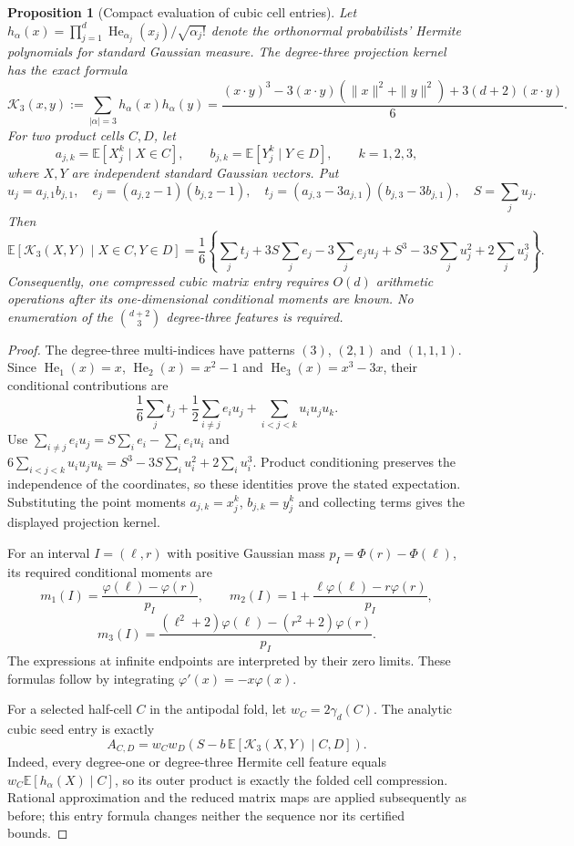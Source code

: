\documentclass[11pt]{article}
\newtheorem{proposition}[theorem]{Proposition}
\begin{document}
\begin{proposition}[Compact evaluation of cubic cell entries]
\label{prop:new-compact-cubic-cell-entry}
Let $h_\alpha(x)=\prod_{j=1}^d
\operatorname{He}_{\alpha_j}(x_j)/\sqrt{\alpha_j!}$ denote the
orthonormal probabilists' Hermite polynomials for standard Gaussian
measure. The degree-three projection kernel has the exact formula
\[
 \mathcal K_3(x,y):=\sum_{|\alpha|=3}h_\alpha(x)h_\alpha(y)
 =\frac{(x\cdot y)^3-3(x\cdot y)(\|x\|^2+\|y\|^2)
                  +3(d+2)(x\cdot y)}6.
\]
For two product cells $C,D$, let
\[
 a_{j,k}=\mathbb E[X_j^k\mid X\in C],\qquad
 b_{j,k}=\mathbb E[Y_j^k\mid Y\in D],\qquad k=1,2,3,
\]
where $X,Y$ are independent standard Gaussian vectors. Put
\[
 u_j=a_{j,1}b_{j,1},\quad
 e_j=(a_{j,2}-1)(b_{j,2}-1),\quad
 t_j=(a_{j,3}-3a_{j,1})(b_{j,3}-3b_{j,1}),\quad S=\sum_j u_j.
\]
Then
\[
 \mathbb E[\mathcal K_3(X,Y)\mid X\in C,Y\in D]
 =\frac16\left\{
 \sum_j t_j+3S\sum_j e_j-3\sum_j e_ju_j
          +S^3-3S\sum_j u_j^2+2\sum_j u_j^3\right\}.
\]
Consequently, one compressed cubic matrix entry requires $O(d)$
arithmetic operations after its one-dimensional conditional moments are
known. No enumeration of the $\binom{d+2}{3}$ degree-three features is
required.
\end{proposition}
\begin{proof}
The degree-three multi-indices have patterns $(3)$, $(2,1)$ and
$(1,1,1)$. Since $\operatorname{He}_1(x)=x$,
$\operatorname{He}_2(x)=x^2-1$ and
$\operatorname{He}_3(x)=x^3-3x$, their conditional contributions are
\[
 \frac16\sum_j t_j
 +\frac12\sum_{i\ne j}e_i u_j
 +\sum_{i<j<k}u_i u_j u_k.
\]
Use $\sum_{i\ne j}e_i u_j=S\sum_i e_i-\sum_i e_i u_i$ and
$6\sum_{i<j<k}u_i u_j u_k
 =S^3-3S\sum_i u_i^2+2\sum_i u_i^3$.
Product conditioning preserves the independence of the coordinates,
so these identities prove the stated expectation. Substituting the
point moments $a_{j,k}=x_j^k$, $b_{j,k}=y_j^k$ and collecting terms
gives the displayed projection kernel.

For an interval $I=(\ell,r)$ with positive Gaussian mass
$p_I=\Phi(r)-\Phi(\ell)$, its required conditional moments are
\[
 m_1(I)=\frac{\varphi(\ell)-\varphi(r)}{p_I},\qquad
 m_2(I)=1+\frac{\ell\varphi(\ell)-r\varphi(r)}{p_I},
\]
\[
 m_3(I)=
 \frac{(\ell^2+2)\varphi(\ell)-(r^2+2)\varphi(r)}{p_I}.
\]
The expressions at infinite endpoints are interpreted by their zero
limits. These formulas follow by integrating
$\varphi'(x)=-x\varphi(x)$.

For a selected half-cell $C$ in the antipodal fold, let
$w_C=2\gamma_d(C)$. The analytic cubic seed entry is exactly
\[
 A_{C,D}=w_Cw_D\left(S-
 b\,\mathbb E[\mathcal K_3(X,Y)\mid C,D]\right).
\]
Indeed, every degree-one or degree-three Hermite cell feature equals
$w_C\mathbb E[h_\alpha(X)\mid C]$, so its outer product is exactly
the folded cell compression. Rational approximation and the reduced
matrix maps are applied subsequently as before; this entry formula
changes neither the sequence nor its certified bounds.
\end{proof}
\end{document}
